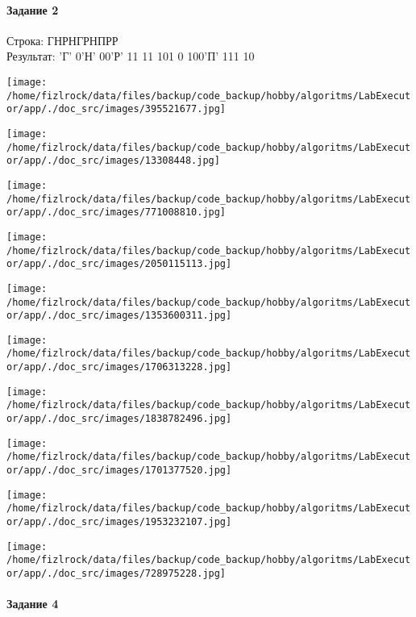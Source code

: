 \documentclass[a4paper, 12pt]{article}
\begin{document}
\paragraph{Задание 2}

Строка: 
ГНРНГРНПРР\\
Результат: 'Г' 0'Н' 00'Р' 11 11 101 0 100'П' 111 10

\texttt{[image: /home/fizlrock/data/files/backup/code\_backup/hobby/algoritms/LabExecutor/app/./doc\_src/images/395521677.jpg]}

\texttt{[image: /home/fizlrock/data/files/backup/code\_backup/hobby/algoritms/LabExecutor/app/./doc\_src/images/13308448.jpg]}

\texttt{[image: /home/fizlrock/data/files/backup/code\_backup/hobby/algoritms/LabExecutor/app/./doc\_src/images/771008810.jpg]}

\texttt{[image: /home/fizlrock/data/files/backup/code\_backup/hobby/algoritms/LabExecutor/app/./doc\_src/images/2050115113.jpg]}

\texttt{[image: /home/fizlrock/data/files/backup/code\_backup/hobby/algoritms/LabExecutor/app/./doc\_src/images/1353600311.jpg]}

\texttt{[image: /home/fizlrock/data/files/backup/code\_backup/hobby/algoritms/LabExecutor/app/./doc\_src/images/1706313228.jpg]}

\texttt{[image: /home/fizlrock/data/files/backup/code\_backup/hobby/algoritms/LabExecutor/app/./doc\_src/images/1838782496.jpg]}

\texttt{[image: /home/fizlrock/data/files/backup/code\_backup/hobby/algoritms/LabExecutor/app/./doc\_src/images/1701377520.jpg]}

\texttt{[image: /home/fizlrock/data/files/backup/code\_backup/hobby/algoritms/LabExecutor/app/./doc\_src/images/1953232107.jpg]}

\texttt{[image: /home/fizlrock/data/files/backup/code\_backup/hobby/algoritms/LabExecutor/app/./doc\_src/images/728975228.jpg]}
\pagebreak
\paragraph{Задание 4}
\end{document}
